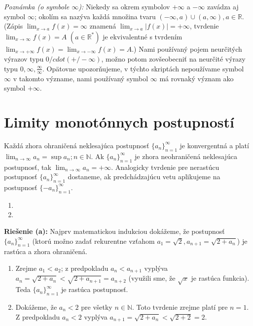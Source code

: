 \textit{Poznámka (o symbole $\infty$):}
Niekedy sa okrem symbolov $+\infty$ a $-\infty$ zavádza aj symbol $\infty$; okolím sa nazýva každá množina tvaru $(-\infty,a)\cup (a,\infty), a \in \mathbb{R}$. (Zápis $\lim_{x \rightarrow a}f(x)=\infty$ znamená $\lim_{x \rightarrow a}|f(x)|=+\infty$, tvrdenie $\lim_{x \rightarrow \infty} f(x)=A$   $(a \in \mathbb{R^*})$ je ekvivalentné s tvrdením $\lim_{x \rightarrow +\infty}f(x)=\lim_{x \rightarrow -\infty}f(x)=A$.) Nami používaný pojem neurčitých výrazov typu $0 /cdot (+/- \infty)$, možno potom zovšeobecniť na neurčité výrazy typu $0, \infty, \frac{\infty}{\infty}$. Opätovne upozorňujeme, v týchto skriptách nepoužívame symbol $\infty$ v takomto význame, nami používaný symbol $\infty$ má rovnaký význam ako symbol $+\infty$.

\section{Limity monotónnych postupností}
\begin{veta}
Každá zhora ohraničená neklesajúca postupnosť ${\{a_n\}}_{n=1}^\infty$ je konvergentná a platí $\lim_{n \rightarrow \infty} a_n=\sup {a_n;n \in \mathbb{N}}$.
Ak ${\{a_n\}}_{n=1}^\infty$ je zhora neohraničená neklesajúca postupnosť, tak $\lim_{n \rightarrow \infty} a_n=+\infty$.
Analogicky tvrdenie pre nerastúcu postupnosť ${\{a_n\}}_{n=1}^\infty$  dostaneme, ak predchádzajúcu vetu aplikujeme na postupnosť ${\{-a_n\}}_{n=1}^\infty$. 
\end{veta}

\begin{enumerate}[resume]
	\item {}
	\item {}
\end{enumerate}

\textbf{Riešenie (a):}
Najprv matematickou indukciou dokážeme, že postupnosť ${\{a_n\}}_{n=1}^\infty$ (ktorú možno zadať rekurentne vzťahom $a_1=\sqrt{2},a_{n+1}=\sqrt{2+a_n}$) je rastúca a zhora ohraničená. 
\begin{enumerate}
\item Zrejme $a_1<a_2$; z predpokladu $a_n<a_{n+1}$ vyplýva $a_n=\sqrt{2+a_n}<\sqrt{2+a_{n+1}}=a_{n+2}$ (využili sme, že $\sqrt{x}$ je rastúca funkcia). Teda ${\{a_n\}}_{n=1}^\infty$ je rastúca postupnosť.
\item Dokážeme, že $a_n<2$ pre všetky $n \in \mathbb{N}$. Toto tvrdenie zrejme platí pre $n=1$. Z predpokladu $a_n<2$ vyplýva $a_{n+1}=\sqrt{2+a_{n}}<\sqrt{2+2}=2$.
\end{enumerate}

